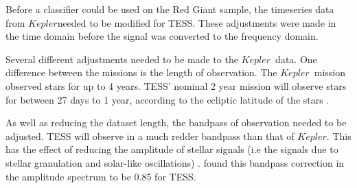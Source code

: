 \documentclass[a4paper,fleqn,usenatbib,useAMS]{mnras}
\newcommand{\kep}{\ensuremath{Kepler}\:}
\begin{document}
Before a classifier could be used on the Red Giant sample, the timeseries data from \kep needed to be modified for TESS. These adjustments were made in the time domain before the signal was converted to the frequency domain.

Several different adjustments needed to be made to the \kep \ data. One difference between the missions is the length of observation. The \kep \ mission observed stars for up to 4 years. TESS' nominal 2 year mission will observe stars for between 27 days to 1 year, according to the ecliptic latitude of the stars \citep{ricker_transiting_2014}.

As well as reducing the dataset length, the bandpass of observation needed to be adjusted. TESS will observe in a much redder bandpass than that of \kep. This has the effect of reducing the amplitude of stellar signals (i.e the signals due to stellar granulation and solar-like oscillations) \citep{ballot_visibilities_2011}. \citet{campante_asteroseismic_2016} found this bandpass correction in the amplitude spectrum to be 0.85 for TESS.
\end{document}
